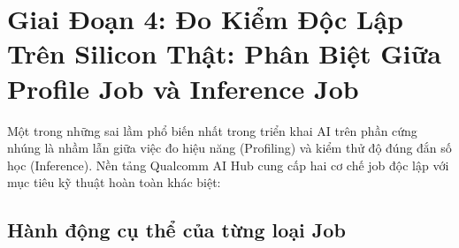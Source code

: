 \documentclass[11pt,a4paper,oneside,table]{report}
\begin{document}
\section{Giai Đoạn 4: Đo Kiểm Độc Lập Trên Silicon Thật: Phân Biệt Giữa Profile Job và Inference Job}
\label{sec:stage4_verification}

Một trong những sai lầm phổ biến nhất trong triển khai AI trên phần cứng nhúng là nhầm lẫn giữa việc đo hiệu năng (Profiling) và kiểm thử độ đúng đắn số học (Inference). Nền tảng Qualcomm AI Hub cung cấp hai cơ chế job độc lập với mục tiêu kỹ thuật hoàn toàn khác biệt:

\subsection{Hành động cụ thể của từng loại Job}
\end{document}
